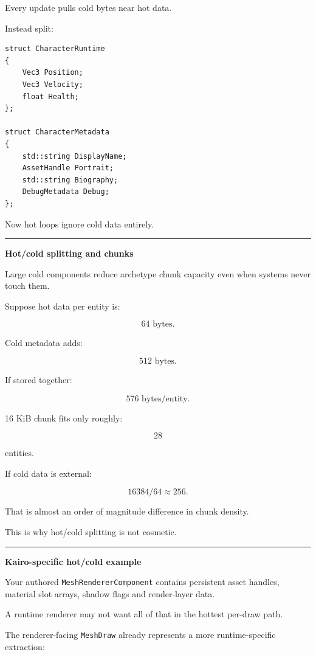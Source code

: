 Every update pulls cold bytes near hot data.

Instead split:

\begin{verbatim}
struct CharacterRuntime
{
    Vec3 Position;
    Vec3 Velocity;
    float Health;
};

struct CharacterMetadata
{
    std::string DisplayName;
    AssetHandle Portrait;
    std::string Biography;
    DebugMetadata Debug;
};
\end{verbatim}

Now hot loops ignore cold data entirely.

\begin{center}\rule{0.5\linewidth}{0.5pt}\end{center}

\textbf{Hot/cold splitting and chunks}

Large cold components reduce archetype chunk capacity even when systems never touch them.

Suppose hot data per entity is:

\[
64\text{ bytes}.
\]

Cold metadata adds:

\[
512\text{ bytes}.
\]

If stored together:

\[
576\text{ bytes/entity}.
\]

16 KiB chunk fits only roughly:

\[
28
\]

entities.

If cold data is external:

\[
16384/64
\approx256.
\]

That is almost an order of magnitude difference in chunk density.

This is why hot/cold splitting is not cosmetic.

\begin{center}\rule{0.5\linewidth}{0.5pt}\end{center}

\textbf{Kairo-specific hot/cold example}

Your authored \texttt{MeshRendererComponent} contains persistent asset handles, material slot arrays, shadow flags and render-layer data.

A runtime renderer may not want all of that in the hottest per-draw path.

The renderer-facing \texttt{MeshDraw} already represents a more runtime-specific extraction:

